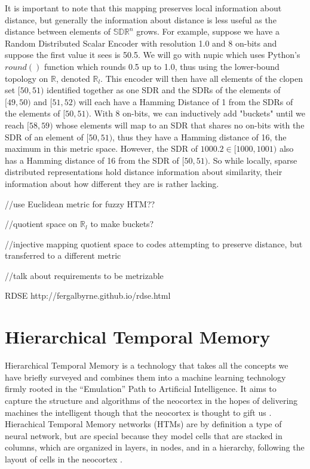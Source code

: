 \documentclass[fleqn,minimal]{article}
\newcommand\blankpage{
	\pagebreak
	\ifthispageodd{\null
		\vfill
		\vfill
		\thispagestyle{empty}
		\clearpage}{}
}
\begin{document}
	It is important to note that this mapping preserves local information about distance, but generally the information about distance is less useful as the distance between elements of $\mathbb{SDR}^{n}$ grows. For example, suppose we have a Random Distributed Scalar Encoder with resolution 1.0 and 8 on-bits and suppose the first value it sees is 50.5. We will go with nupic which uses Python's $round()$ function which rounds 0.5 up to 1.0, thus using the lower-bound topology on $\mathbb{R}$, denoted $\mathbb{R}_{l}$. This encoder will then have all elements of the clopen set $[50,51)$ identified together as one SDR and the SDRs of the elements of $[49,50)$ and $[51,52)$ will each have a Hamming Distance of 1 from the SDRs of the elements of $[50,51)$. With 8 on-bits, we can inductively add "buckets" until we reach $[58,59)$ whose elements will map to an SDR that shares no on-bits with the SDR of an element of $[50,51)$, thus they have a Hamming distance of 16, the maximum in this metric space. However, the SDR of $1000.2 \in [1000,1001)$ also has a Hamming distance of 16 from the SDR of $[50,51)$. So while locally, sparse distributed representations hold distance information about similarity, their information about how different they are is rather lacking.
	
	//use Euclidean metric for fuzzy HTM?? 
	
	//quotient space on $\mathbb{R}_{l}$ to make buckets?
	
	//injective mapping quotient space to codes attempting to preserve distance, but transferred to a different metric
	
	//talk about requirements to be metrizable
	
	RDSE http://fergalbyrne.github.io/rdse.html
	
	\blankpage
	\section{Hierarchical Temporal Memory}
	
	Hierarchical Temporal Memory is a technology that takes all the concepts we have briefly surveyed and combines them into a machine learning technology firmly rooted in the ``Emulation'' Path to Artificial Intelligence. It aims to capture the structure and algorithms of the neocortex in the hopes of delivering machines the intelligent though that the neocortex is thought to gift us \cite{Whitepaper}. Hierachical Temporal Memory networks (HTMs) are by definition a type of neural network, but are special because they model cells that are stacked in columns, which are organized in layers, in nodes, and in a hierarchy, following the layout of cells in the neocortex \cite{Whitepaper}.
	
\end{document}
